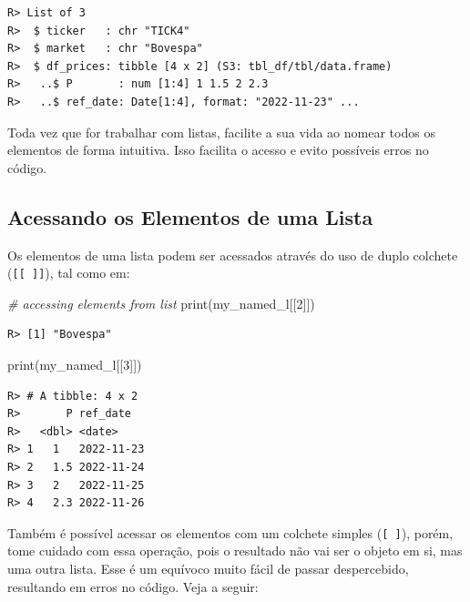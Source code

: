 \documentclass[
  11pt,
]{book}
\newenvironment{Shaded}{\begin{snugshade}}{\end{snugshade}}
\newcommand{\CommentTok}[1]{\textcolor[rgb]{0.37,0.37,0.37}{\textit{#1}}}
\newcommand{\DecValTok}[1]{\textcolor[rgb]{0.06,0.06,0.06}{#1}}
\newcommand{\FunctionTok}[1]{\textcolor[rgb]{0,0,0}{#1}}
\newcommand{\NormalTok}[1]{#1}
\newenvironment{rmdimportant}
{\begin{importantblock}

	} {\end{importantblock}}
\begin{document}
\begin{verbatim}
R> List of 3
R>  $ ticker   : chr "TICK4"
R>  $ market   : chr "Bovespa"
R>  $ df_prices: tibble [4 x 2] (S3: tbl_df/tbl/data.frame)
R>   ..$ P       : num [1:4] 1 1.5 2 2.3
R>   ..$ ref_date: Date[1:4], format: "2022-11-23" ...
\end{verbatim}

\begin{rmdimportant}
Toda vez que for trabalhar com listas, facilite a sua vida ao nomear
todos os elementos de forma intuitiva. Isso facilita o acesso e evito
possíveis erros no código.
\end{rmdimportant}

\hypertarget{acessando-os-elementos-de-uma-lista}{%
\subsection{Acessando os Elementos de uma Lista}\label{acessando-os-elementos-de-uma-lista}}

Os elementos de uma lista podem ser acessados através do uso de duplo colchete (\texttt{{[}{[}\ {]}{]}}), tal como em:

\begin{Shaded}
\begin{Highlighting}[]
\CommentTok{\# accessing elements from list}
\FunctionTok{print}\NormalTok{(my\_named\_l[[}\DecValTok{2}\NormalTok{]])}
\end{Highlighting}
\end{Shaded}

\begin{verbatim}
R> [1] "Bovespa"
\end{verbatim}

\begin{Shaded}
\begin{Highlighting}[]
\FunctionTok{print}\NormalTok{(my\_named\_l[[}\DecValTok{3}\NormalTok{]])}
\end{Highlighting}
\end{Shaded}

\begin{verbatim}
R> # A tibble: 4 x 2
R>       P ref_date  
R>   <dbl> <date>    
R> 1   1   2022-11-23
R> 2   1.5 2022-11-24
R> 3   2   2022-11-25
R> 4   2.3 2022-11-26
\end{verbatim}

Também é possível acessar os elementos com um colchete simples (\texttt{{[}\ {]}}), porém, tome cuidado com essa operação, pois o resultado não vai ser o objeto em si, mas uma outra lista. Esse é um equívoco muito fácil de passar despercebido, resultando em erros no código. Veja a seguir:
\end{document}
